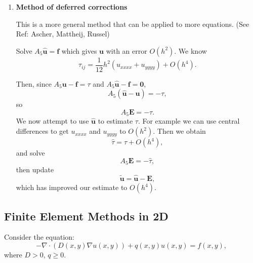 \documentclass[12pt, a4paper]{article}
\renewcommand{\vec}[1]{\mathbf{#1}}
\theoremstyle{definition}
\newtheorem{example}[thm]{Example}
\theoremstyle{remark}
\numberwithin{equation}{section}
\begin{document}
\begin{itemize}
\begin{enumerate}
\begin{example}
For the special case $f=0$ then error is $O(h^4)$, \mbox{$\nabla^2_9u=0 \to A_9\vec{u}=\vec{b}$}, $\tau=O(h^4)$. 
\end{example}

Back to Poisson's equation: since
 \[ -\nabla_9^2u=f+\frac{1}{12}h^2\nabla^2f  +O(h^4),\]
then if we solve the {\em different problem}:
 \[ -\nabla_9^2u=f+\frac{1}{12}h^2\nabla^2f=\tilde{f},\]
  then \[-\nabla^2u +\frac{1}{12}h^2\nabla^2\tilde{f}+O(h^4)=\tilde{f},\]
  therefore \[-\nabla^2u +\frac{1}{12}h^2\nabla^2f+O(h^4)=f+\frac{1}{12}h^2\nabla^2f,\]
   so
    \[-\nabla^2 u+O(h^4)=f,\]
    i.e. we've solved $-\nabla^2 u=f$ to $O(h^4)$.

This also works even if we don't know $f$ analytically, but just at grid points. 
Just form 
\begin{align*}
\tilde{f}_{ij}=&f_{ij}+\frac{1}{12}h^2\nabla_5^2f_{ij}\\
=&f_{ij}+\frac{1}{12}h^2(\nabla^2f+O(h^2))\\
=&f_{ij}+\frac{1}{12}h^2\nabla^2f_{ij}+O(h^4),
\end{align*}
so we still get a 4th order method.

\item  {\bf Method of deferred corrections}

This is a more general method that can be applied to more equations. (See Ref: Ascher, Mattheij, Russel)

Solve $A_5\hat{\vec{u}}=\vec{f}$ which  gives $\vec{u}$ with an error $O(h^2)$. We know 
\[ \tau_{ij} = \frac{1}{12}h^2(u_{xxxx}+u_{yyyy}) + O(h^4).\]

Then, since $A_5\vec{u}-\vec{f}=\tau$ and $A_5\hat{\vec{u}}-\vec{f}=\vec{0}$, 
 \[ 
A_5(\hat{\vec{u}}-\vec{u})=-\tau,
\]
so
 \[ 
A_5 \vec{E} = -\tau.
\]
We now attempt to use $\hat{\vec{u}}$ to estimate $\tau$.
For example we can use central differences to get $u_{xxxx}$ and $u_{yyyy}$ to  $O(h^2)$. Then we obtain 
\[\hat{\tau} = \tau +O(h^4),\] 
and solve 
\[A_5 \vec{E}=-\hat{\tau},\] 
then update 
\[\tilde{\vec{u}}=\hat{\vec{u}}-\vec{E},\] 
which has improved our estimate to $O(h^4)$.
\end{enumerate}
\end{itemize}

\newpage
\subsection{Finite Element Methods in 2D}
Consider the equation:
\begin{equation*}
-\nabla \cdot (D(x,y)\nabla u(x,y))+q(x,y)u(x,y)=f(x,y),
\end{equation*}
where $D > 0$, $q \ge 0$. 
\end{document}
